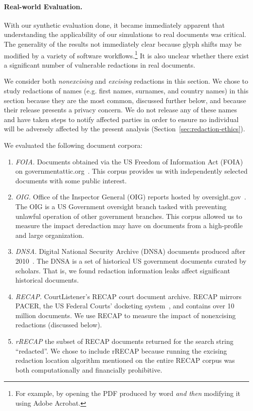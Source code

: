 \paragraph{Real-world Evaluation.}

With our synthetic evaluation done, it became immediately apparent that understanding the applicability of our simulations to real documents was critical.
The generality of the results not immediately clear because glyph shifts may be modified by a variety of software workflows.\footnote{
    For example, by opening the PDF produced by word \emph{and then} modifying it using Adobe Acrobat. 
}
It is also unclear whether there exist a significant number of vulnerable redactions in real documents.

We consider both \emph{nonexcising} and \emph{excising} redactions in this section.
We chose to study redactions of names (e.g. first names, surnames, and country names) in this section because they are the most common, discussed further below, and because their release presents a privacy concern.
We do not release any of these names and have taken steps to notify affected parties in order to ensure no individual will be adversely affected by the present analysis (Section~\ref{sec:redaction-ethics}).

We evaluated the following document corpora: 

\begin{enumerate}
    \item \emph{FOIA.} Documents obtained via the US Freedom of Information Act (FOIA) on governmentattic.org~\cite{govattic}. 
This corpus provides us with independently selected documents with some public interest.
    \item \emph{OIG.} Office of the Inspector General (OIG) reports hosted by oversight.gov~\cite{oigReports}. 
The OIG is a US Government oversight branch tasked with preventing unlawful operation of other government branches.
This corpus allowed us to measure the impact deredaction may have on documents from a high-profile and large organization.
    \item \emph{DNSA.} Digital National Security Archive (DNSA) documents produced after 2010~\cite{dnsaSite}. 
The DNSA is a set of historical US government documents curated by scholars. 
That is, we found redaction information leaks affect significant historical documents.
    \item \emph{RECAP.} CourtListener's RECAP court document archive.
RECAP mirrors PACER, the US Federal Courts' docketing system~\cite{pacerSite}, and contains over 10 million documents.
We use RECAP to measure the impact of nonexcising redactions (discussed below).
    \item \emph{rRECAP} the subset of RECAP documents returned for the search string ``redacted''.
We chose to include rRECAP because running the excising redaction location algorithm mentioned on the entire RECAP corpus was both computationally and financially prohibitive.
\end{enumerate}

